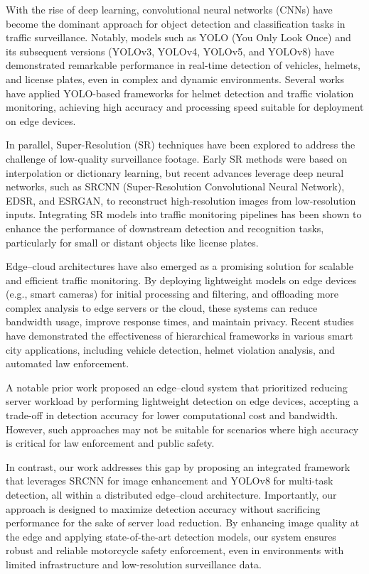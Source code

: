 \documentclass[conference]{IEEEtran}
\begin{document}
With the rise of deep learning, convolutional neural networks (CNNs) have become the dominant approach for object detection and classification tasks in traffic surveillance. Notably, models such as YOLO (You Only Look Once) and its subsequent versions (YOLOv3, YOLOv4, YOLOv5, and YOLOv8) have demonstrated remarkable performance in real-time detection of vehicles, helmets, and license plates, even in complex and dynamic environments. Several works have applied YOLO-based frameworks for helmet detection and traffic violation monitoring, achieving high accuracy and processing speed suitable for deployment on edge devices.

In parallel, Super-Resolution (SR) techniques have been explored to address the challenge of low-quality surveillance footage. Early SR methods were based on interpolation or dictionary learning, but recent advances leverage deep neural networks, such as SRCNN (Super-Resolution Convolutional Neural Network), EDSR, and ESRGAN, to reconstruct high-resolution images from low-resolution inputs. Integrating SR models into traffic monitoring pipelines has been shown to enhance the performance of downstream detection and recognition tasks, particularly for small or distant objects like license plates.

Edge–cloud architectures have also emerged as a promising solution for scalable and efficient traffic monitoring. By deploying lightweight models on edge devices (e.g., smart cameras) for initial processing and filtering, and offloading more complex analysis to edge servers or the cloud, these systems can reduce bandwidth usage, improve response times, and maintain privacy. Recent studies have demonstrated the effectiveness of hierarchical frameworks in various smart city applications, including vehicle detection, helmet violation analysis, and automated law enforcement.

A notable prior work proposed an edge–cloud system that prioritized reducing server workload by performing lightweight detection on edge devices, accepting a trade-off in detection accuracy for lower computational cost and bandwidth. However, such approaches may not be suitable for scenarios where high accuracy is critical for law enforcement and public safety.

In contrast, our work addresses this gap by proposing an integrated framework that leverages SRCNN for image enhancement and YOLOv8 for multi-task detection, all within a distributed edge–cloud architecture. Importantly, our approach is designed to maximize detection accuracy without sacrificing performance for the sake of server load reduction. By enhancing image quality at the edge and applying state-of-the-art detection models, our system ensures robust and reliable motorcycle safety enforcement, even in environments with limited infrastructure and low-resolution surveillance data.
\end{document}
